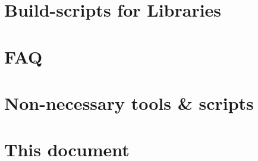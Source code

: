 % 
%               
%          
% 

\begin{appendices}

\chapter{Build-scripts for Libraries}
\setcounter{currentlevel}{6}


\chapter{FAQ}
\setcounter{currentlevel}{6}


%

\chapter{Non-necessary tools \& scripts}
\setcounter{currentlevel}{6}


\chapter{This document}
\setcounter{currentlevel}{6}


\end{appendices}

